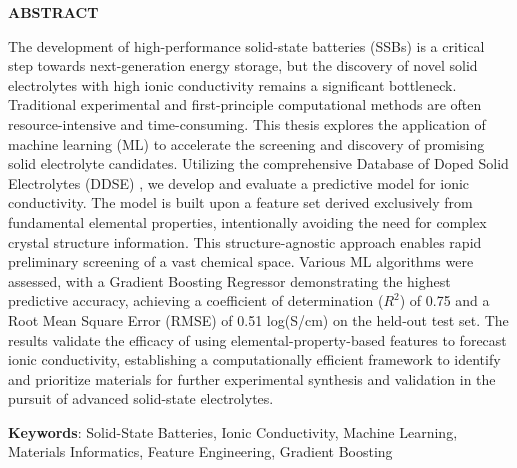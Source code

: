 \thispagestyle{plain}
\begin{center}
    \Large \textbf{\uppercase{Abstract}}
\end{center}

\vspace{3\baselineskip}

\noindent
The development of high-performance solid-state batteries (SSBs) is a critical step towards next-generation energy storage, but the discovery of novel solid electrolytes with high ionic conductivity remains a significant bottleneck. Traditional experimental and first-principle computational methods are often resource-intensive and time-consuming. This thesis explores the application of machine learning (ML) to accelerate the screening and discovery of promising solid electrolyte candidates. Utilizing the comprehensive Database of Doped Solid Electrolytes (DDSE) \cite{DDSE2021}, we develop and evaluate a predictive model for ionic conductivity. The model is built upon a feature set derived exclusively from fundamental elemental properties, intentionally avoiding the need for complex crystal structure information. This structure-agnostic approach enables rapid preliminary screening of a vast chemical space. Various ML algorithms were assessed, with a Gradient Boosting Regressor demonstrating the highest predictive accuracy, achieving a coefficient of determination (\(R^2\)) of 0.75 and a Root Mean Square Error (RMSE) of 0.51 log(S/cm) on the held-out test set. The results validate the efficacy of using elemental-property-based features to forecast ionic conductivity, establishing a computationally efficient framework to identify and prioritize materials for further experimental synthesis and validation in the pursuit of advanced solid-state electrolytes.


\vspace{\baselineskip}

\noindent
\textbf{Keywords}: Solid-State Batteries, Ionic Conductivity, Machine Learning, Materials Informatics, Feature Engineering, Gradient Boosting

